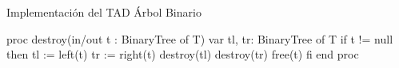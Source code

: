 \begin{codebox}{Implementación del TAD Árbol Binario}
\begin{pascallike}
proc destroy(in/out t : BinaryTree of T)
    var tl, tr: BinaryTree of T
    if t != null then
        tl := left(t)
        tr := right(t)
        destroy(tl)
        destroy(tr)
        free(t)
    fi
end proc

\end{pascallike}
\end{codebox}